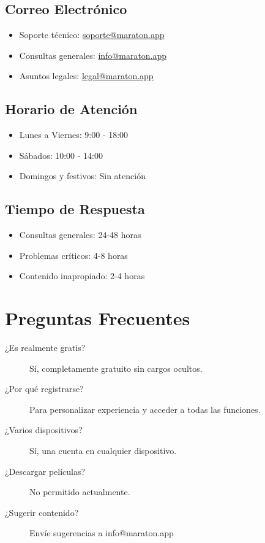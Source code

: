\documentclass[11pt,a4paper,twoside]{book}
\begin{document}
\subsection{Correo Electrónico}
\begin{itemize}
    \item Soporte técnico: \href{mailto:soporte@maraton.app}{soporte@maraton.app}
    \item Consultas generales: \href{mailto:info@maraton.app}{info@maraton.app}
    \item Asuntos legales: \href{mailto:legal@maraton.app}{legal@maraton.app}
\end{itemize}

\subsection{Horario de Atención}
\begin{itemize}
    \item Lunes a Viernes: 9:00 - 18:00
    \item Sábados: 10:00 - 14:00
    \item Domingos y festivos: Sin atención
\end{itemize}

\subsection{Tiempo de Respuesta}
\begin{itemize}
    \item Consultas generales: 24-48 horas
    \item Problemas críticos: 4-8 horas
    \item Contenido inapropiado: 2-4 horas
\end{itemize}

\section{Preguntas Frecuentes}

\begin{description}
    \item[¿Es realmente gratis?] Sí, completamente gratuito sin cargos ocultos.
    \item[¿Por qué registrarse?] Para personalizar experiencia y acceder a todas las funciones.
    \item[¿Varios dispositivos?] Sí, una cuenta en cualquier dispositivo.
    \item[¿Descargar películas?] No permitido actualmente.
    \item[¿Sugerir contenido?] Envíe sugerencias a info@maraton.app
\end{description}
\end{document}
